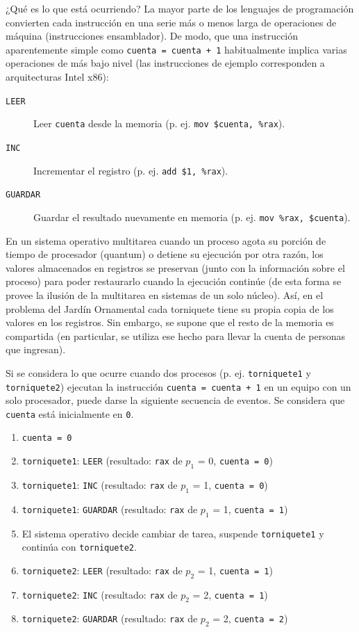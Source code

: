 \documentclass[11pt,fleqn]{book} %
\begin{document}
¿Qué es lo que está ocurriendo? La mayor parte de los lenguajes de
programación convierten cada instrucción en una serie más o menos
larga de operaciones de máquina (instrucciones ensamblador). De modo,
que una instrucción aparentemente simple como \texttt{cuenta = cuenta + 1}
habitualmente implica varias operaciones de más bajo nivel (las instrucciones
de ejemplo corresponden a arquitecturas Intel x86):

\begin{description}
\item[\texttt{LEER}] Leer \texttt{cuenta} desde la memoria (p. ej. \texttt{mov \$cuenta, \%rax}).
\item[\texttt{INC}] Incrementar el registro (p. ej. \texttt{add \$1, \%rax}).
\item[\texttt{GUARDAR}] Guardar el resultado nuevamente en memoria (p. ej. \texttt{mov 	       \%rax, \$cuenta}).
\end{description}

En un sistema operativo multitarea cuando un proceso agota su porción
de tiempo de procesador (quantum) o detiene su ejecución por otra
razón, los valores almacenados en registros se preservan (junto con la
información sobre el proceso) para poder restaurarlo cuando la
ejecución continúe (de esta forma se provee la ilusión de la
multitarea en sistemas de un solo núcleo). Así, en el problema del
Jardín Ornamental cada torniquete tiene su propia copia de los valores
en los registros. Sin embargo, se supone que el resto de la memoria es
compartida (en particular, se utiliza ese hecho para llevar la cuenta
de personas que ingresan).

Si se considera lo que ocurre cuando dos procesos (p. ej. \texttt{torniquete1}
y \texttt{torniquete2}) ejecutan la instrucción \texttt{cuenta = cuenta + 1} en un equipo con un
solo procesador, puede darse la siguiente secuencia de eventos. Se
considera que \texttt{cuenta} está inicialmente en \texttt{0}.

\begin{enumerate}
\item \texttt{cuenta = 0}
\item \texttt{torniquete1}: \texttt{LEER} (resultado: \texttt{rax} de $p_1$ = 0, \texttt{cuenta = 0})
\item \texttt{torniquete1}: \texttt{INC} (resultado: \texttt{rax} de $p_1$ = 1, \texttt{cuenta = 0})
\item \texttt{torniquete1}: \texttt{GUARDAR} (resultado: \texttt{rax} de $p_1$ = 1, \texttt{cuenta = 1})
\item El sistema operativo decide cambiar de tarea, suspende \texttt{torniquete1} y
   continúa con \texttt{torniquete2}.
\item \texttt{torniquete2}: \texttt{LEER} (resultado: \texttt{rax} de $p_2$ = 1, \texttt{cuenta = 1})
\item \texttt{torniquete2}: \texttt{INC} (resultado: \texttt{rax} de $p_2$ = 2, \texttt{cuenta = 1})
\item \texttt{torniquete2}: \texttt{GUARDAR} (resultado: \texttt{rax} de $p_2$ = 2, \texttt{cuenta = 2})
\end{enumerate}
\end{document}
